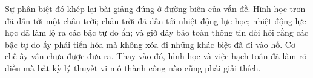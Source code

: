 \begin{classroomqa}
\end{classroomqa}

Sự phân biệt đó khép lại bài giảng đúng ở đường biên của vấn đề. Hình học trơn đã dẫn tới một chân trời; chân trời đã dẫn tới nhiệt động lực học; nhiệt động lực học đã làm lộ ra các bậc tự do ẩn; và giờ đây bảo toàn thông tin đòi hỏi rằng các bậc tự do ấy phải tiến hóa mà không xóa đi những khác biệt đã đi vào hố. Cơ chế ấy vẫn chưa được đưa ra. Thay vào đó, hình học và việc hạch toán đã làm rõ điều mà bất kỳ lý thuyết vi mô thành công nào cũng phải giải thích.
